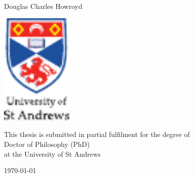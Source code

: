 \begin{titlepage}
  \centering

  {\Huge \textbf{\printtitle} \par}
  \vspace{5em}

  {\huge Douglas Charles Howroyd}
  \vspace{6em}

  \includegraphics[height=14.8em,keepaspectratio,clip=true]{pics/arms}
  \vspace{5em}

  {\large \doublespacing
    This thesis is submitted in partial fulfilment for the degree of\\
    Doctor of Philosophy (PhD)\\
    at the University of St Andrews \par}
  \vspace{7em}

  \UKvardate
  {\Large \today}
\end{titlepage}
